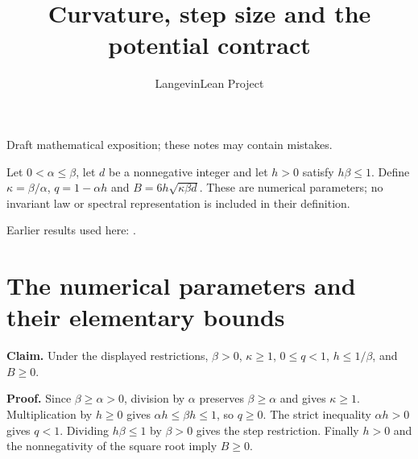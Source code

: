 \documentclass[11pt,a4paper]{article}
\title{\texorpdfstring{Curvature, step size and the potential contract}{Curvature, step size and the potential contract}}
\author{LangevinLean Project}
\date{}
\begin{document}
\maketitle
Draft mathematical exposition; these notes may contain mistakes.


Let \(0<\alpha\le\beta\), let \(d\) be a nonnegative integer and let \(h>0\) satisfy \(h\beta\le1\). Define \(\kappa=\beta/\alpha\), \(q=1-\alpha h\) and \(B=6h\sqrt{\kappa\beta d}\). These are numerical parameters; no invariant law or spectral representation is included in their definition.



Earlier results used here: \cite[Section~3.10]{LangevinLean2026ULASC}.

\section{\texorpdfstring{The numerical parameters and their elementary bounds}{The numerical parameters and their elementary bounds}}


\textbf{Claim.} Under the displayed restrictions, \(\beta>0\), \(\kappa\ge1\), \(0\le q<1\), \(h\le1/\beta\), and \(B\ge0\).



\textbf{Proof.} Since \(\beta\ge\alpha>0\), division by \(\alpha\) preserves \(\beta\ge\alpha\) and gives \(\kappa\ge1\). Multiplication by \(h\ge0\) gives \(\alpha h\le\beta h\le1\), so \(q\ge0\). The strict inequality \(\alpha h>0\) gives \(q<1\). Dividing \(h\beta\le1\) by \(\beta>0\) gives the step restriction. Finally \(h>0\) and the nonnegativity of the square root imply \(B\ge0\).
\end{document}
